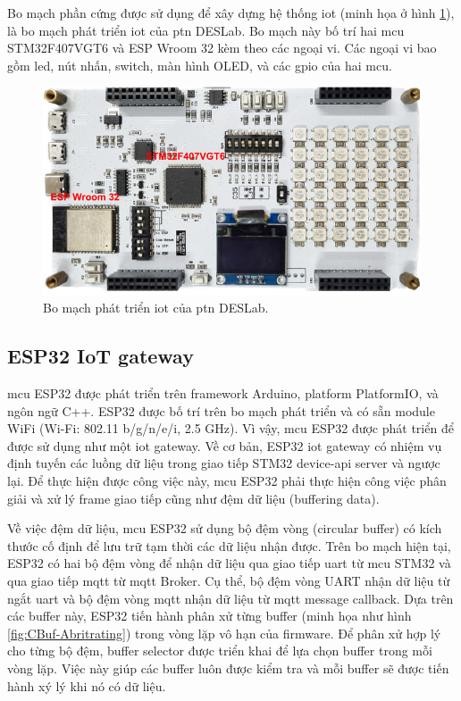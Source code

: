 Bo mạch phần cứng được sử dụng để xây dựng hệ thống \acrshort{iot} (minh họa ở hình \ref{fig:IoT-Dev-Board}), là bo mạch phát triển \acrshort{iot} của \acrshort{ptn} DESLab. Bo mạch này bố trí hai \acrshort{mcu} STM32F407VGT6 và ESP Wroom 32 kèm theo các ngoại vi. Các ngoại vi bao gồm led, nút nhấn, switch, màn hình OLED, và các \acrshort{gpio} của hai \acrshort{mcu}.

\begin{figure}[htp]
\centering
\includegraphics[width=1.0\linewidth]{images/Thesis-Page-1-Bo-mach.pdf}
\caption{Bo mạch phát triển \acrshort{iot} của \acrshort{ptn} DESLab.}
\label{fig:IoT-Dev-Board}
\end{figure}

\subsection{ESP32 IoT gateway}
\label{ESP32-IoT-gateway}

\acrshort{mcu} ESP32 được phát triển trên framework Arduino, platform PlatformIO, và ngôn ngữ C++. ESP32 được bố trí trên bo mạch phát triển và có sẵn module WiFi (Wi-Fi: 802.11 b/g/n/e/i, 2.5 GHz). Vì vậy, \acrshort{mcu} ESP32 được phát triển để được sử dụng như một \acrshort{iot} gateway. Về cơ bản, ESP32 \acrshort{iot} gateway có nhiệm vụ định tuyến các luồng dữ liệu trong giao tiếp STM32 device-\acrshort{api} server và ngược lại. Để thực hiện được công việc này, \acrshort{mcu} ESP32 phải thực hiện công việc phân giải và xử lý frame giao tiếp cũng như đệm dữ liệu (buffering data).

Về việc đệm dữ liệu, \acrshort{mcu} ESP32 sử dụng bộ đệm vòng (circular buffer) có kích thước cố định để lưu trữ tạm thời các dữ liệu nhận được. Trên bo mạch hiện tại, ESP32 có hai bộ đệm vòng để nhận dữ liệu qua giao tiếp \acrshort{uart} từ \acrshort{mcu} STM32 và qua giao tiếp \acrshort{mqtt} từ \acrshort{mqtt} Broker. Cụ thể, bộ đệm vòng UART nhận dữ liệu từ ngắt \acrshort{uart} và bộ đệm vòng \acrshort{mqtt} nhận dữ liệu từ \acrshort{mqtt} message callback. Dựa trên các buffer này, ESP32 tiến hành phân xử từng buffer (minh họa như hình \ref{fig:CBuf-Abritrating}) trong vòng lặp vô hạn của firmware. Để phân xử hợp lý cho từng bộ đệm, buffer selector được triển khai để lựa chọn buffer trong mỗi vòng lặp. Việc này giúp các buffer luôn được kiểm tra và mỗi buffer sẽ được tiến hành xý lý khi nó có dữ liệu.

